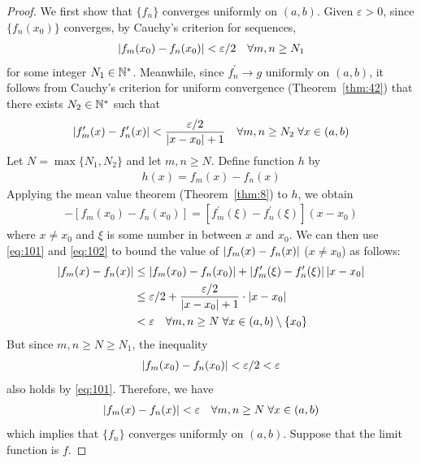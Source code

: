 \documentclass[thmcnt=section, 12pt]{my-elegantbook}
\begin{document}
\begin{proof}
    We first show that $\{f_n\}$ converges uniformly on $(a, b)$. Given $\varepsilon > 0$, since $\{f_n(x_0)\}$ converges, by Cauchy's criterion for sequences,
    \begin{align}
        \left\lvert f_m(x_0) - f_n(x_0) \right\rvert < \varepsilon / 2
        \quad \forall m,n \geq N_1
        \label{eq:101}
    \end{align}
    for some integer $N_1 \in \mathbb{N}^\ast$. Meanwhile, since $f^\prime_n \to g$ uniformly on $(a, b)$, it follows from Cauchy's criterion for uniform convergence (Theorem~\ref{thm:42}) that there exists $N_2 \in \mathbb{N}^\ast$ such that
    \begin{align}
        \left\lvert f^\prime_m(x) - f^\prime_n(x) \right\rvert < \frac{\varepsilon / 2}{\left\lvert x - x_0 \right\rvert + 1}
        \quad \forall m, n \geq N_2 \;
        \forall x \in (a, b)
        \label{eq:102}
    \end{align}
    Let $N = \max\{N_1, N_2\}$ and let $m, n \geq N$. Define function $h$ by 
    \begin{align*}
        h(x) = f_m(x) - f_n(x)
    \end{align*}
    Applying the mean value theorem (Theorem~\ref{thm:8}) to $h$, we obtain
    \begin{align*}
        [f_m(x) - f_n(x)] - [f_m(x_0) - f_n(x_0)]
        = [f^\prime_m(\xi) - f^\prime_n(\xi)] (x - x_0)
    \end{align*} 
    where $x \neq x_0$ and $\xi$ is some number in between $x$ and $x_0$. We can then use \eqref{eq:101} and \eqref{eq:102} to bound the value of $\left\lvert f_m(x) - f_n(x) \right\rvert$ ($x \neq x_0$) as follows:
    \begin{align*}
        \left\lvert f_m(x) - f_n(x) \right\rvert
        &\leq \left\lvert f_m(x_0) - f_n(x_0) \right\rvert
        + \left\lvert f^\prime_m(\xi) - f^\prime_n(\xi) \right\rvert \left\lvert x - x_0 \right\rvert \\
        &\leq \varepsilon / 2 + \frac{\varepsilon / 2}{\left\lvert x - x_0 \right\rvert + 1} \cdot \left\lvert x - x_0 \right\rvert \\ 
        &< \varepsilon 
        \quad \forall m,n \geq N \;
        \forall x \in (a, b) \setminus \{x_0\}
    \end{align*}
    But since $m,n \geq N \geq N_1$, the inequality
    \begin{align*}
        \left\lvert f_m(x_0) - f_n(x_0) \right\rvert < \varepsilon / 2 < \varepsilon
    \end{align*}
    also holds by \eqref{eq:101}. Therefore, we have
    \begin{align*}
        \left\lvert f_m(x) - f_n(x) \right\rvert
        < \varepsilon
        \quad \forall m,n \geq N \;
        \forall x \in (a, b)
    \end{align*}
    which implies that $\{f_n\}$ converges uniformly on $(a, b)$. Suppose that the limit function is $f$.


\end{proof}
\end{document}
